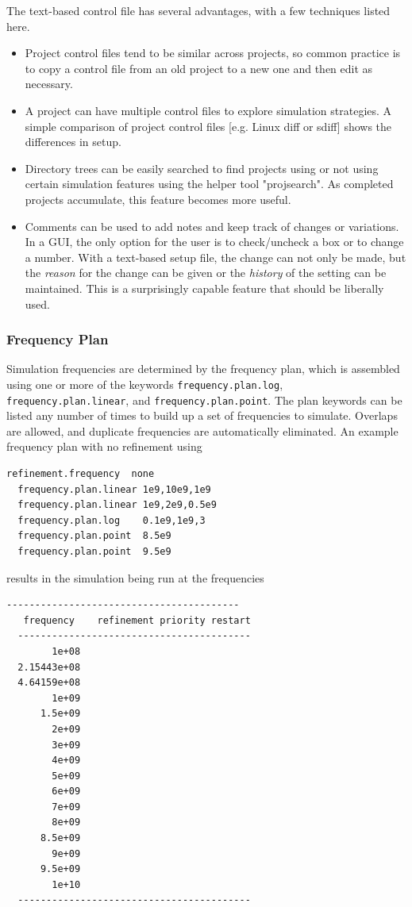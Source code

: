 \documentclass[titlepage]{article}
\renewcommand\_{\textunderscore\linebreak[1]}
\begin{document}
The text-based control file has several advantages, with a few techniques listed here.
\begin{itemize}[nosep]
  \item Project control files tend to be similar across projects, so common practice is to copy a control file from an old project to a new one and then edit as necessary.
  \item A project can have multiple control files to explore simulation strategies.  A simple comparison of project control files [e.g. Linux diff or sdiff] shows the differences in setup.
  \item Directory trees can be easily searched to find projects using or not using certain simulation features using the helper tool "proj\_search".  As completed projects accumulate, this feature becomes more useful.
  \item Comments can be used to add notes and keep track of changes or variations.  In a GUI, the only option for the user is to check/uncheck a box or to change a number.  With a text-based setup file, the change can not only be made, but the \textit{reason} for the change can be given or the \textit{history} of the setting can be maintained.  This is a surprisingly capable feature that should be liberally used.
\end{itemize}

\subsubsection{Frequency Plan}

Simulation frequencies are determined by the frequency plan, which is assembled using one or more of the keywords \texttt{frequency.plan.log}, \texttt{frequency.plan.linear}, and \texttt{frequency.plan.point}.  The plan keywords can be listed any number of times to build up a set of frequencies to simulate.  Overlaps are allowed, and duplicate frequencies are automatically eliminated.  An example frequency plan with no refinement using
\begin{Verbatim}[fontsize=\small]
  refinement.frequency  none
  frequency.plan.linear 1e9,10e9,1e9
  frequency.plan.linear 1e9,2e9,0.5e9
  frequency.plan.log    0.1e9,1e9,3
  frequency.plan.point  8.5e9
  frequency.plan.point  9.5e9
\end{Verbatim}
\noindent results in the simulation being run at the frequencies 
\begin{Verbatim}[fontsize=\small]
  -----------------------------------------
   frequency    refinement priority restart
  -----------------------------------------
        1e+08
  2.15443e+08
  4.64159e+08
        1e+09
      1.5e+09
        2e+09
        3e+09
        4e+09
        5e+09
        6e+09
        7e+09
        8e+09
      8.5e+09
        9e+09
      9.5e+09
        1e+10
  -----------------------------------------
\end{Verbatim}
\end{document}
